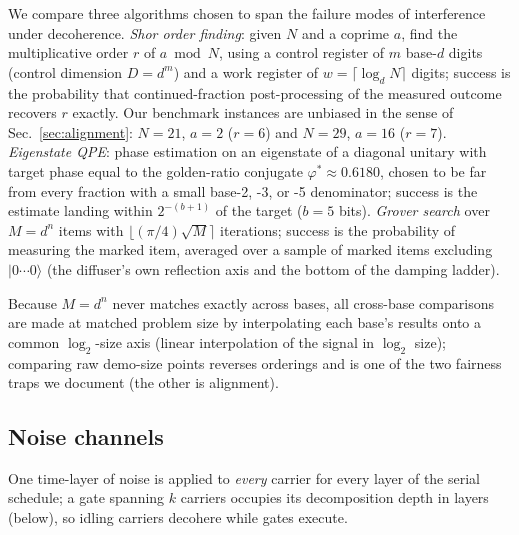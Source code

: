 \documentclass[aps,pra,reprint,superscriptaddress,nofootinbib,floatfix]{revtex4-2}
\begin{document}
We compare three algorithms chosen to span the failure modes of
interference under decoherence. \emph{Shor order finding}: given $N$ and
a coprime $a$, find the multiplicative order $r$ of $a \bmod N$, using a
control register of $m$ base-$d$ digits (control dimension $D=d^m$) and a
work register of $w=\lceil\log_d N\rceil$ digits; success is the
probability that continued-fraction post-processing of the measured
outcome recovers $r$ exactly. Our benchmark instances are unbiased in the
sense of Sec.~\ref{sec:alignment}: $N=21$, $a=2$ ($r=6$) and $N=29$,
$a=16$ ($r=7$). \emph{Eigenstate QPE}: phase estimation on an
eigenstate of a diagonal unitary with target phase equal to the
golden-ratio conjugate $\varphi^\ast\approx0.6180$, chosen to be far
from every fraction with a small base-2, -3, or -5 denominator; success
is the estimate landing within $2^{-(b+1)}$ of the target ($b=5$ bits).
\emph{Grover search} over $M=d^n$ items with
$\lfloor(\pi/4)\sqrt{M}\rceil$ iterations; success is the probability of
measuring the marked item, averaged over a sample of marked items
excluding $\lvert 0\cdots0\rangle$ (the diffuser's own reflection axis
and the bottom of the damping ladder).

Because $M=d^n$ never matches exactly across bases, all cross-base
comparisons are made at matched problem size by interpolating each
base's results onto a common $\log_2$-size axis (linear interpolation
of the signal in $\log_2$ size); comparing raw
demo-size points reverses orderings and is one of the two fairness traps
we document (the other is alignment).

\subsection{Noise channels}
\label{sec:channels}

One time-layer of noise is applied to \emph{every} carrier for every
layer of the serial schedule; a gate spanning $k$ carriers occupies its
decomposition depth in layers (below), so idling carriers decohere while
gates execute.
\end{document}
